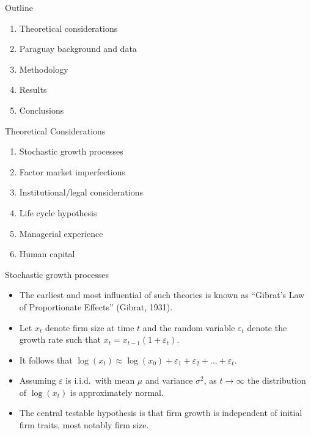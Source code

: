 \documentclass[xcolor=dvipsnames]{beamer}
\begin{document}
\begin{frame}{Outline}
\begin{enumerate}
\item Theoretical considerations
\item Paraguay background and data
\item Methodology
\item Results
\item Conclusions
\end{enumerate}
\end{frame}

\begin{frame}{Theoretical Considerations}
\begin{enumerate}
\item Stochastic growth processes
\item Factor market imperfections
\item Institutional/legal considerations
\item Life cycle hypothesis
\item Managerial experience
\item Human capital
\end{enumerate}
\end{frame}

\begin{frame}{Stochastic growth processes}
\begin{itemize}
\item The earliest and most influential of such theories is known as
``Gibrat's Law of Proportionate Effects'' (Gibrat, 1931).
\par\pause\noindent \item Let $x_t$ denote firm size at time $t$ and 
the random variable $\varepsilon_t$ denote the growth rate such that 
$x_t = x_{t-1}(1 + \varepsilon_t)$. 
\par\pause\noindent \item It follows that $\log(x_t) \approx 
\log(x_{0}) + \varepsilon_1 + \varepsilon_2 + \ldots + \varepsilon_t$. 
\par\pause\noindent \item Assuming $\varepsilon$ is i.i.d.\ with mean 
$\mu$ and variance $\sigma^2$, as $t \to \infty$ the distribution of 
$\log(x_t)$ is approximately normal.
\par\pause\noindent \item The central testable hypothesis is that firm 
growth is independent of initial firm traits, most notably firm size.
\end{itemize}
\end{frame}
\end{document}
